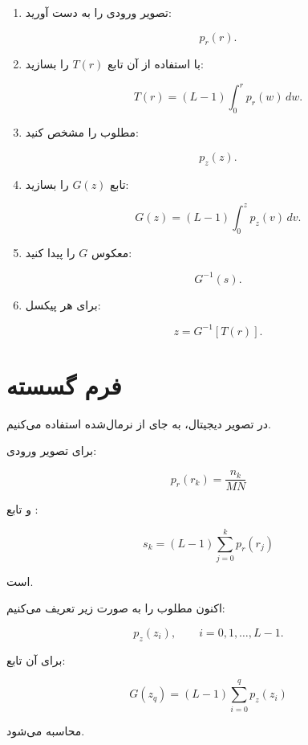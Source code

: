 \documentclass[12pt,a4paper]{article}
\begin{document}
	\begin{enumerate}
		\item {} تصویر ورودی را به دست آورید:
		
		\[
		p_r(r).
		\]
		
		\item با استفاده از آن تابع $T(r)$ را بسازید:
		
		\[
		T(r)
		=
		(L-1)\int_0^r p_r(w)\,dw.
		\]
		
		\item {} مطلوب را مشخص کنید:
		
		\[
		p_z(z).
		\]
		
		\item تابع $G(z)$ را بسازید:
		
		\[
		G(z)
		=
		(L-1)\int_0^z p_z(v)\,dv.
		\]
		
		\item معکوس $G$ را پیدا کنید:
		
		\[
		G^{-1}(s).
		\]
		
		\item برای هر پیکسل:
		
		\[
		z=G^{-1}[T(r)].
		\]
	\end{enumerate}
	
	
	\section{فرم گسسته }
	
	در تصویر دیجیتال، به جای  از  نرمال‌شده استفاده می‌کنیم.
	
	برای تصویر ورودی:
	
	\[
	\boxed{
		p_r(r_k)
		=
		\frac{n_k}{MN}
	}
	\tag{19}
	\]
	
	و تابع :
	
	\[
	\boxed{
		s_k
		=
		(L-1)
		\sum_{j=0}^{k}
		p_r(r_j)
	}
	\tag{20}
	\]
	
	است.
	
	اکنون  مطلوب را به صورت زیر تعریف می‌کنیم:
	
	\[
	p_z(z_i),
	\qquad
	i=0,1,\ldots,L-1.
	\]
	
	برای آن تابع:
	
	\[
	\boxed{
		G(z_q)
		=
		(L-1)
		\sum_{i=0}^{q}
		p_z(z_i)
	}
	\tag{21}
	\]
	
	محاسبه می‌شود.
	
	
\end{document}
